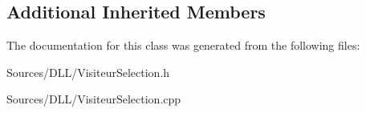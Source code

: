 \subsection*{Additional Inherited Members}


The documentation for this class was generated from the following files\+:\begin{DoxyCompactItemize}
\item 
Sources/\+D\+L\+L/Visiteur\+Selection.\+h\item 
Sources/\+D\+L\+L/Visiteur\+Selection.\+cpp\end{DoxyCompactItemize}
